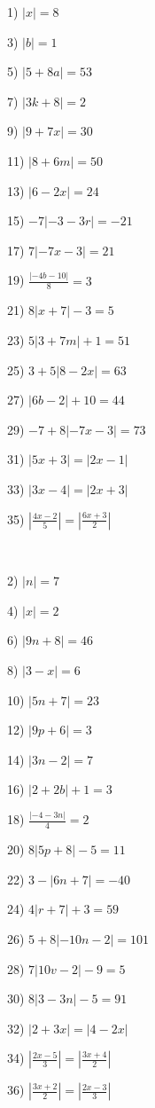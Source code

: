 \begin{multicols}{2}
  1) $| x| = 8$
  
  3) $| b| = 1$
  
  5) $| 5 + 8 a| = 53$
  
  7) $|3k + 8| = 2$
  
  9) $|9 + 7 x| = 30$
  
  11) $|8 + 6 m| = 50$
  
  13) $|6 - 2 x| = 24$
  
  15) $- 7| - 3 - 3 r| = - 21$
  
  17) $7 | - 7 x - 3| = 21$
  
  19) $\frac{| - 4 b - 10|}{8} = 3$
  
  21) $8 | x + 7 | - 3 = 5$
  
  23) $5 |3 + 7 m| + 1 = 51$
  
  25) $3 + 5 |8 - 2 x| = 63$ \
  
  27) $|6b - 2| + 10 = 44$
  
  29) $- 7 + 8| - 7 x - 3| = 73$
  
  31) $|5x + 3| = |2x - 1|$
  
  33) $| 3 x - 4| = |2x + 3|$
  
  35) $| \frac{4 x - 2}{5} | = | \frac{6 x + 3}{2} |$
  
  \
  
  2) $| n | = 7$
  
  4) $| x | = 2$
  
  6) $|9n + 8| = 46$
  
  8) $|3 - x| = 6$
  
  10) $|5n + 7| = 23$
  
  12) $|9p + 6| = 3$
  
  14) $|3n - 2| = 7$
  
  16) $| 2 + 2 b| + 1 = 3$
  
  18) $\frac{| - 4 - 3 n|}{4} = 2$
  
  20) $8 |5p + 8| - 5 = 11$
  
  22) $3 - |6n + 7| = - 40$
  
  24) $4 |r + 7| + 3 = 59$
  
  26) $5 + 8| - 10 n - 2| = 101$
  
  28) $7 |10v - 2| - 9 = 5$
  
  30) $8 |3 - 3 n| - 5 = 91$
  
  32) $| 2 + 3 x| = |4 - 2 x|$
  
  34) $| \frac{2 x - 5}{3} | = | \frac{3 x + 4}{2} |$
  
  36) $| \frac{3 x + 2}{2} | = | \frac{2 x - 3}{3} |$
\end{multicols}

